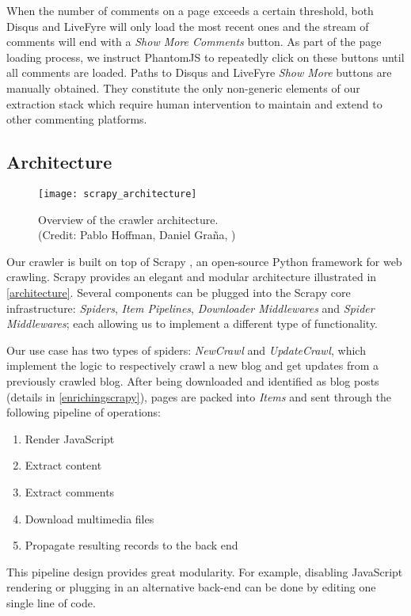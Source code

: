 When the number of comments on a page exceeds a certain threshold, both Disqus and LiveFyre will only load the most recent ones and the stream of comments will end with a \emph{Show More Comments} button. As part of the page loading process, we instruct PhantomJS to repeatedly click on these buttons until all comments are loaded. Paths to Disqus and LiveFyre \emph{Show More} buttons are manually obtained. They constitute the only non-generic elements of our extraction stack which require human intervention to maintain and extend to other commenting platforms.


\subsection{Architecture}

\begin{figure}
  \capstart
  \centering
  \texttt{[image: scrapy\_architecture]}
  \caption{Overview of the crawler architecture.\\(Credit: Pablo Hoffman, Daniel Graña, \cite{scrapy2013})}
  \label{architecture}
\end{figure}

Our crawler is built on top of Scrapy \cite{scrapy2013}, an open-source Python framework for web crawling. Scrapy provides an elegant and modular architecture illustrated in \autoref{architecture}. Several components can be plugged into the Scrapy core infrastructure: \emph{Spiders}, \emph{Item Pipelines}, \emph{Downloader Middlewares} and \emph{Spider Middlewares}; each allowing us to implement a different type of functionality.

Our use case has two types of spiders: \emph{NewCrawl} and \emph{UpdateCrawl}, which implement the logic to respectively crawl a new blog and get updates from a previously crawled blog. After being downloaded and identified as blog posts (details in \autoref{enrichingscrapy}), pages are packed into \emph{Items} and sent through the following pipeline of operations:
\begin{enumerate}[noitemsep]
  \item Render JavaScript
  \item Extract content
  \item Extract comments
  \item Download multimedia files
  \item Propagate resulting records to the back end
\end{enumerate}
This pipeline design provides great modularity. For example, disabling JavaScript rendering or plugging in an alternative back-end can be done by editing one single line of code.


